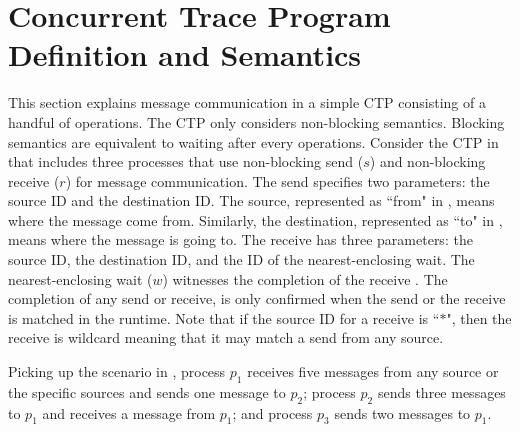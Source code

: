\section{Concurrent Trace Program Definition and Semantics}

\examplefigone

This section explains message communication in a simple CTP consisting of a handful of operations. The CTP only considers non-blocking semantics. Blocking semantics are equivalent to waiting after every operations. Consider the CTP in  that includes three processes that use non-blocking send ($s$) and non-blocking receive ($r$) for message communication. The send specifies two parameters: the source ID and the destination ID. The source, represented as ``from" in , means where the message come from. Similarly, the destination, represented as ``to" in , means where the message is going to. The receive has three parameters: the source ID, the destination ID, and the ID of the nearest-enclosing wait. The nearest-enclosing wait ($w$) witnesses the completion of the receive \cite{DBLP:conf/kbse/HuangMM13}. The completion of any send or receive, is only confirmed when the send or the receive is matched in the runtime. Note that if the source ID for a receive is ``$\ast$", then the receive is wildcard meaning that it may match a send from any source. 

Picking up the scenario in , process $p_1$ receives five messages from any source or the specific sources and sends one message to $p_2$; process $p_2$ sends three messages to $p_1$ and receives a message from $p_1$; and process $p_3$ sends two messages to $p_1$. 


